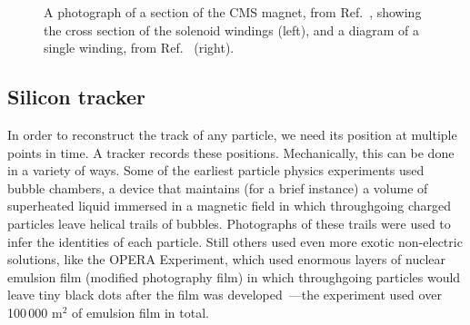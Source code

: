 \begin{figure}[htb]
    \centering
    \quad
    \caption{
        A photograph of a section of the CMS magnet, from Ref.~\cite{CourierSolenoid}, showing the cross section of the solenoid windings (left), and a diagram of a single winding, from Ref.~\cite{CERN-LHCC-97-010} (right). 
    }
    \label{fig:cms_magnet}
\end{figure}

\subsection{Silicon tracker}
In order to reconstruct the track of any particle, we need its position at multiple points in time. 
A tracker records these positions. 
Mechanically, this can be done in a variety of ways. 
Some of the earliest particle physics experiments used bubble chambers, a device that maintains (for a brief instance) a volume of superheated liquid immersed in a magnetic field in which throughgoing charged particles leave helical trails of bubbles. 
Photographs of these trails were used to infer the identities of each particle. 
Still others used even more exotic non-electric solutions, like the OPERA Experiment, which used enormous layers of nuclear emulsion film (modified photography film) in which throughgoing particles would leave tiny black dots after the film was developed\footnotemark{}~\cite{Acquafredda:2009zz}---the experiment used over 100\,000 m$^2$ of emulsion film in total. 

